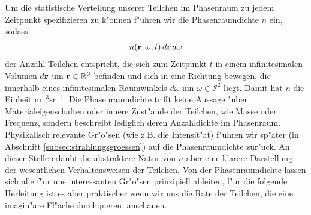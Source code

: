 	Um die statistische Verteilung unserer Teilchen im Phasenraum zu jedem Zeitpunkt spezifizieren zu k"onnen f"uhren wir die Phasenraumdichte $n$ ein, sodass $$n(\mathbf{r},\omega,t)\,d\mathbf{r}\,d\omega$$ der Anzahl Teilchen entspricht, die sich zum Zeitpunkt $t$ in einem infinitesimalen Volumen $d\mathbf{r}$ um $\mathbf{r} \in \mathbb{R}^3$ befinden und sich in eine Richtung bewegen, die innerhalb eines infinitesimalen Raumwinkels $d\omega$ um $\omega \in \mathcal{S}^2$ liegt. Damit hat $n$ die Einheit $\text{m}^{-3}\text{sr}^{-1}$. Die Phasenraumdichte trifft keine Aussage "uber Materialeigenschaften oder innere Zust"ande der Teilchen, wie Masse oder Frequenz, sondern beschreibt lediglich deren Anzahldichte im Phasenraum. Physikalisch relevante Gr"o"sen (wie z.B. die Intensit"at) f"uhren wir sp"ater (in Abschnitt \ref{subsec:strahlungsgroessen}) auf die Phasenraumdichte zur"uck. An dieser Stelle erlaubt die abstraktere Natur von $n$ aber eine klarere Darstellung der wesentlichen Verhaltensweisen der Teilchen. Von der Phasenraumdichte lassen sich alle f"ur uns interessanten Gr"o"sen prinzipiell ableiten, f"ur die folgende Herleitung ist es aber praktischer wenn wir uns die Rate der Teilchen, die eine imagin"are Fl"ache durchqueren, anschauen.
	
